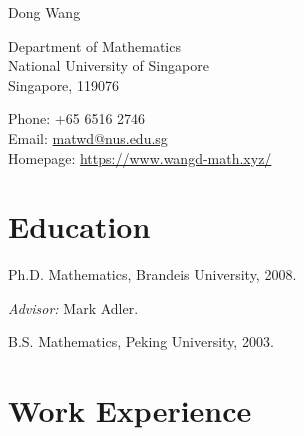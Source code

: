 \documentclass[12pt,a4paper]{article}
\def\name{Dong Wang}
\newenvironment{item_list}{
 \begin{list}{}{
   \setlength{\leftmargin}{1.5em}
   \setlength{\itemsep}{0.25em}
   \setlength{\parskip}{0pt}
   \setlength{\parsep}{0.25em}
 }
}{
 \end{list}
}
\begin{document}
{\huge \name}


\bigskip

\begin{minipage}[t]{0.5\textwidth}
  Department of Mathematics \\
  National University of Singapore \\
  Singapore, 119076
\end{minipage}
\begin{minipage}[t]{0.5\textwidth}
  Phone: +65 6516 2746 \\
  Email: \href{mailto:matwd@nus.edu.sg}{matwd@nus.edu.sg} \\
  Homepage: \href{https://www.wangd-math.xyz/}{{https://www.wangd-math.xyz/}}
\end{minipage}

\section*{Education}

\begin{item_list}
  \item Ph.D. Mathematics, Brandeis University, 2008.
    \begin{item_list}
    \item \textit{Advisor:}
      Mark Adler.
    \end{item_list}
  \item B.S. Mathematics, %
    Peking University, 2003.
\end{item_list}

\section*{Work Experience}
\end{document}
